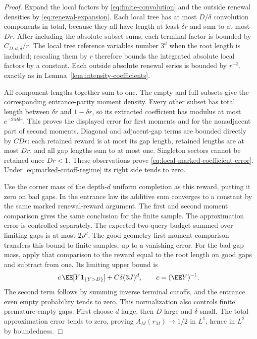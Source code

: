 \documentclass[11pt,letterpaper]{article}
\newcommand{\ind}{\mathbf 1}\newcommand{\Exp}{\operatorname{Exp}}
\begin{document}
\begin{proof}
Expand the local factors by \eqref{eq:finite-convolution} and the
outside renewal densities by \eqref{eq:renewal-expansion}. Each local
tree has at most $D/\delta$ convolution components in total, because
they all have length at least $\delta r$ and sum to at most $Dr$.
After including the absolute subset sums, each terminal factor is bounded
by $C_{D,d,\delta}/r$. The local tree reference variables number
$3^d$ when the root length is included; rescaling them by $r$
therefore bounds the integrated absolute local factors by a constant.
Each outside absolute renewal series is bounded by $r^{-3}$, exactly
as in Lemma~\ref{lem:intensity-coefficients}.

All component lengths together sum to one. The empty and full subsets
give the corresponding entrance-parity moment density. Every other
subset has total length between $\delta r$ and $1-\delta r$, so its
extracted coefficient has modulus at most $e^{-2M\delta r}$.
This proves the displayed error for first moments and for the
nonadjacent part of second moments. Diagonal and adjacent-gap terms
are bounded directly by $CDr$: each retained reward is at most its
gap length, retained lengths are at most $Dr$, and all gap lengths
sum to at most one. Singleton sectors cannot be retained once
$Dr<1$. These observations prove
\eqref{eq:local-marked-coefficient-error}. Under
\eqref{eq:marked-cutoff-regime} its right side tends to zero.

Use the corner mass of the depth-$d$ uniform completion as this
reward, putting it zero on bad gaps. In the entrance law its additive
sum converges to a constant by the same marked renewal-reward argument.
The first and second moment comparison gives the same conclusion for
the finite sample. The approximation error is controlled separately.
The expected two-query budget summed over limiting gaps is at most
$2\rho^d$. The good-geometry first-moment comparison transfers this
bound to finite samples, up to a vanishing error. For the bad-gap
mass, apply that comparison to the reward equal to the root length
on good gaps and subtract from one. Its limiting upper bound is
\[
 c\,\EE[Y\ind_{\{Y>D\}}]+C\delta(3J)^d,
 \qquad c=(\EE Y)^{-1}.
\]
The second term follows by summing inverse terminal cutoffs, and
the entrance even empty probability tends to zero. This normalization
also controls finite premature-empty gaps. First choose $d$ large,
then $D$ large and $\delta$ small. The total approximation error tends
to zero, proving $A_M(r_M)\to1/2$ in $L^1$, hence in $L^2$ by boundedness.


\end{proof}
\end{document}
